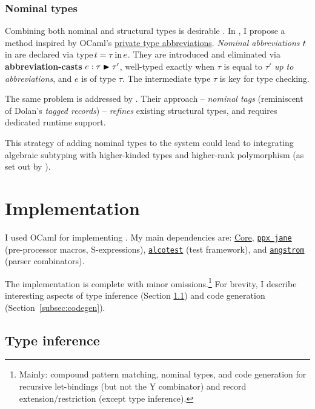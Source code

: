 \subsubsection{Nominal types} 
Combining both nominal and structural types is desirable \cite{mlstruct, integrating-nominal-and-structural}. In \fabric{}, I propose a method inspired by OCaml's \href{https://ocaml.org/manual/5.1/privatetypes.html#ss:private-types-abbrev}{private type abbreviations}.
\emph{Nominal abbreviations} $t$ in \fabric{} are declared via $\mathrm{type}\,t=\tau\,\mathrm{in}\,e$. They are introduced and eliminated via \textbf{abbreviation-casts} ${e} : {\tau} \blacktriangleright {\tau'}$, well-typed exactly when $\tau$ is equal to $\tau'$ \emph{up to abbreviations}, and $e$ is of type $\tau$. The intermediate type $\tau$ is key for type checking.

The same problem is addressed by \textcite{mlstruct}. Their approach -- \emph{nominal tags} (reminiscent of Dolan's \emph{tagged records}) -- \emph{refines} existing structural types, and requires dedicated runtime support.

This strategy of adding nominal types to the system could lead to integrating algebraic subtyping with higher-kinded types and higher-rank polymorphism (as set out by \textcite[Section~11.1]{dolan-thesis}). 

\section{Implementation}
\label{sec:fabric-impl}

I used OCaml for implementing \compiler{}. My main dependencies are: \href{https://opensource.janestreet.com/core/}{Core}, \href{https://github.com/janestreet/ppx_jane}{\texttt{ppx\_jane}} (pre-processor macros, S-expressions), \href{https://github.com/mirage/alcotest}{\texttt{alcotest}} (test framework), and \href{https://github.com/inhabitedtype/angstrom}{\texttt{angstrom}} (parser combinators).

The implementation is complete with minor omissions.\footnote{Mainly: compound pattern matching, nominal types, and code generation for recursive let-bindings (but not the Y combinator) and record extension/restriction (except type inference).} For brevity, I describe interesting aspects of type inference (Section \ref{subsec:type-inference-impl}) and code generation (Section~\ref{subsec:codegen}).

\subsection{Type inference} 
\label{subsec:type-inference-impl}

